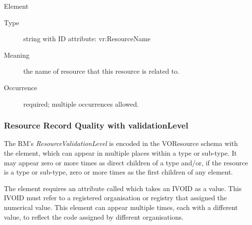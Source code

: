 \documentclass[11pt,a4paper]{ivoa}
\begin{document}
\begin{generated}
\begin{bigdescription}
\begin{description}
\end{description}
\item[Element \xmlel{relatedResource}]
\begin{description}
\item[Type] string with ID attribute: vr:ResourceName
\item[Meaning] 
                  the name of resource that this resource is related to.
               
\item[Occurrence] required; multiple occurrences allowed.

\end{description}


\end{bigdescription}\endgroup

\endgroup
\end{generated}



\subsubsection{Resource Record Quality with validationLevel}



The RM's \emph{ResourceValidationLevel} is encoded in the VOResource
schema with the  element, which can appear in
multiple places within a  type or sub-type.  It may
appear zero or more times as direct children of a 
type and/or, if the resource is a  type or sub-type,
zero or more times as the first children of any 
element.  

The  element requires an attribute called
 which takes an IVOID as a value.  This IVOID
must refer to a registered organisation or registry that assigned the
numerical value.  This element can appear multiple times, each with
a different  value, to reflect the code
assigned by different organisations. 
\end{document}
